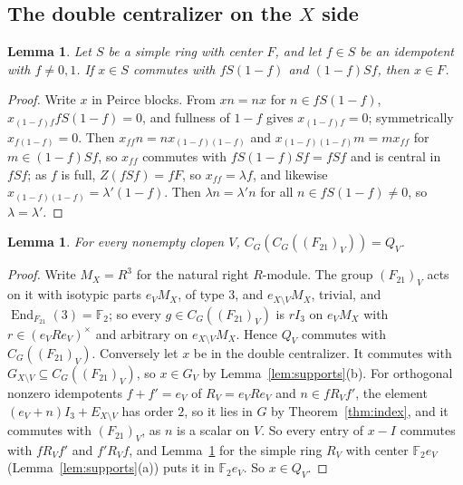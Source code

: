 \documentclass[11pt]{amsart}
\newtheorem{lemma}[theorem]{Lemma}
\theoremstyle{remark}
\newcommand{\F}{\mathbb F}
\newcommand{\End}{\operatorname{End}}
\begin{document}
\subsection*{The double centralizer on the $X$ side}

\begin{lemma}\label{lem:Z}
Let $S$ be a simple ring with center $F$, and let $f\in S$ be an idempotent
with $f\ne0,1$. If $x\in S$ commutes with $fS(1-f)$ and $(1-f)Sf$, then
$x\in F$.
\end{lemma}

\begin{proof}
Write $x$ in Peirce blocks. From $xn=nx$ for $n\in fS(1-f)$,
$x_{(1-f)f}fS(1-f)=0$, and fullness of $1-f$ gives $x_{(1-f)f}=0$;
symmetrically $x_{f(1-f)}=0$. Then $x_{ff}n=nx_{(1-f)(1-f)}$ and
$x_{(1-f)(1-f)}m=mx_{ff}$ for $m\in(1-f)Sf$, so $x_{ff}$ commutes with
$fS(1-f)Sf=fSf$ and is central in $fSf$; as $f$ is full,
$Z(fSf)=fF$, so $x_{ff}=\lambda f$, and likewise
$x_{(1-f)(1-f)}=\lambda'(1-f)$. Then $\lambda n=\lambda'n$ for all
$n\in fS(1-f)\ne0$, so $\lambda=\lambda'$.
\end{proof}

\begin{lemma}\label{lem:X}
For every nonempty clopen $V$, $C_G(C_G((F_{21})_V))=Q_V$.
\end{lemma}

\begin{proof}
Write $M_X=R^3$ for the natural right $R$-module. The group $(F_{21})_V$
acts on it with isotypic parts $e_VM_X$, of type $3$, and $e_{X\setminus V}M_X$,
trivial, and $\End_{F_{21}}(3)=\F_2$; so every $g\in C_G((F_{21})_V)$ is
$rI_3$ on $e_VM_X$ with $r\in(e_VRe_V)^\times$ and arbitrary on
$e_{X\setminus V}M_X$. Hence $Q_V$ commutes with $C_G((F_{21})_V)$.
Conversely let $x$ be in the double centralizer. It commutes with
$G_{X\setminus V}\subseteq C_G((F_{21})_V)$, so $x\in G_V$ by
Lemma~\ref{lem:supports}(b). For orthogonal nonzero idempotents $f+f'=e_V$
of $R_V=e_VRe_V$ and $n\in fR_Vf'$, the element
$(e_V+n)I_3+E_{X\setminus V}$ has order $2$, so it lies in $G$ by
Theorem~\ref{thm:index}, and it commutes with $(F_{21})_V$, as $n$ is a
scalar on $V$. So every entry of $x-I$ commutes with $fR_Vf'$ and
$f'R_Vf$, and Lemma~\ref{lem:Z} for the simple ring $R_V$ with center
$\F_2e_V$ (Lemma~\ref{lem:supports}(a)) puts it in $\F_2e_V$. So $x\in Q_V$.
\end{proof}
\end{document}
